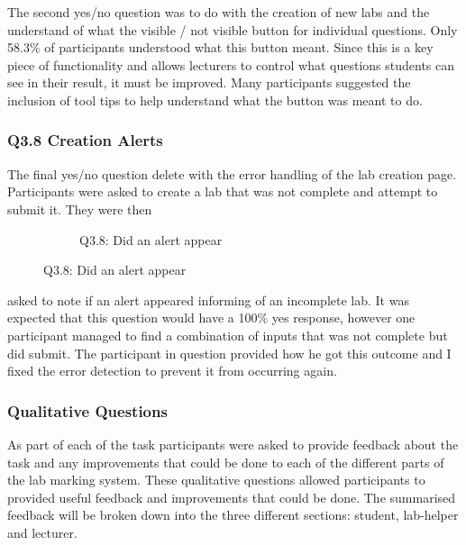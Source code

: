 \documentclass[12pt]{article}  %
\begin{document}
The second yes/no question was to do with the creation of new labs and the understand of what the visible / not visible button for individual questions. Only 58.3\% of participants understood what this button meant. Since this is a key piece of functionality and allows lecturers to control what questions students can see in their result, it must be improved. Many participants suggested the inclusion of tool tips to help understand what the button was meant to do. 


\subsubsection{Q3.8 Creation Alerts}



The final yes/no question delete with the error handling of the lab creation page. Participants were asked to create a lab that was not complete and attempt to submit it. They were then

\begin{figure}
\vspace*{-\baselineskip}
\begin{figure}[H]
\caption{Q3.8: Did an alert appear}


\end{figure}
\end{figure}

\noindent asked to note if an alert appeared informing of an incomplete lab. It was expected that this question would have a 100\% yes response, however one participant managed to find a combination of inputs that was not complete but did submit. The participant in question provided how he got this outcome and I fixed the error detection to prevent it from occurring again.


\subsubsection{Qualitative Questions}

As part of each of the task participants were asked to provide feedback about the task and any improvements that could be done to each of the different parts of the lab marking system. These qualitative questions allowed participants to provided useful feedback and improvements that could be done. The summarised feedback will be broken down into the three different sections: student, lab-helper and lecturer.
\end{document}
